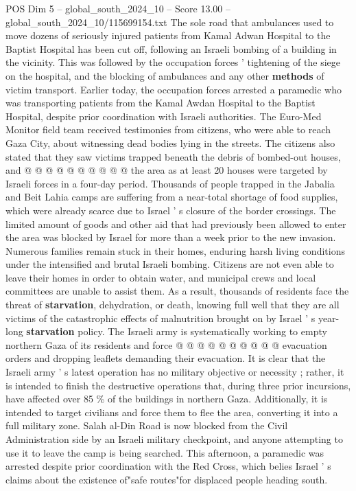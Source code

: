 \begin{textsample}{POS Dim 5 – global\_south\_2024\_10 – Score 13.00 – global\_south\_2024\_10/115699154.txt}
The sole road that ambulances used to move dozens of seriously injured patients from Kamal Adwan Hospital to the Baptist Hospital has been cut off, following an Israeli bombing of a building in the vicinity.
This was followed by the occupation forces ' tightening of the siege on the hospital, and the blocking of ambulances and any other \textbf{methods} of victim transport.
Earlier today, the occupation forces arrested a paramedic who was transporting patients from the Kamal Awdan Hospital to the Baptist Hospital, despite prior coordination with Israeli authorities.
The Euro-Med Monitor field team received testimonies from citizens, who were able to reach Gaza City, about witnessing dead bodies lying in the streets.
The citizens also stated that they saw victims trapped beneath the debris of bombed-out houses, and @ @ @ @ @ @ @ @ @ @ the area as at least 20 houses were targeted by Israeli forces in a four-day period.
Thousands of people trapped in the Jabalia and Beit Lahia camps are suffering from a near-total shortage of food supplies, which were already scarce due to Israel ' s closure of the border crossings.
The limited amount of goods and other aid that had previously been allowed to enter the area was blocked by Israel for more than a week prior to the new invasion.
Numerous families remain stuck in their homes, enduring harsh living conditions under the intensified and brutal Israeli bombing.
Citizens are not even able to leave their homes in order to obtain water, and municipal crews and local committees are unable to assist them.
As a result, thousands of residents face the threat of \textbf{starvation}, dehydration, or death, knowing full well that they are all victims of the catastrophic effects of malnutrition brought on by Israel ' s year-long \textbf{starvation} policy.
The Israeli army is systematically working to empty northern Gaza of its residents and force @ @ @ @ @ @ @ @ @ @ evacuation orders and dropping leaflets demanding their evacuation.
It is clear that the Israeli army ' s latest operation has no military objective or necessity ; rather, it is intended to finish the destructive operations that, during three prior incursions, have affected over 85 \% of the buildings in northern Gaza.
Additionally, it is intended to target civilians and force them to flee the area, converting it into a full military zone.
Salah al-Din Road is now blocked from the Civil Administration side by an Israeli military checkpoint, and anyone attempting to use it to leave the camp is being searched.
This afternoon, a paramedic was arrested despite prior coordination with the Red Cross, which belies Israel ' s claims about the existence of"safe routes"for displaced people heading south.

\end{textsample}
